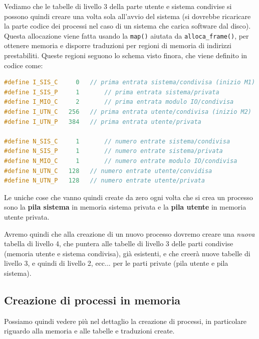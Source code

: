 \documentclass[a4paper,11pt]{article}
\begin{document}
Vediamo che le tabelle di livello 3 della parte utente e sistema condivise si possono quindi creare una volta sola all'avvio del sistema (si dovrebbe ricaricare la parte codice dei processi nel caso di un sistema che carica software dal disco).
Questa allocazione viene fatta usando la \lstinline|map()| aiutata da \lstinline|alloca_frame()|, per ottenere memoria e disporre traduzioni per regioni di memoria di indirizzi prestabiliti.
Queste regioni seguono lo schema visto finora, che viene definito in codice come:
\begin{lstlisting}[language=C++, style=codestyle]	
#define I_SIS_C		0 	// prima entrata sistema/condivisa (inizio M1)
#define I_SIS_P		1		// prima entrata sistema/privata
#define I_MIO_C		2		// prima entrata modulo IO/condivisa
#define I_UTN_C   256	// prima entrata utente/condivisa (inizio M2)
#define I_UTN_P	  384	// prima entrata utente/privata

#define N_SIS_C		1		// numero entrate sistema/condivisa
#define N_SIS_P		1		// numero entrate sistema/privata
#define N_MIO_C		1		// numero entrate modulo IO/condivisa
#define N_UTN_C	  128	// numero entrate utente/convidisa
#define N_UTN_P	  128	// numero entrate utente/privata
\end{lstlisting}

Le uniche cose che vanno quindi create da zero ogni volta che si crea un processo sono la \textbf{pila sistema} in memoria sistema privata e la \textbf{pila utente} in memoria utente privata.

Avremo quindi che alla creazione di un nuovo processo dovremo creare una \textit{nuova} tabella di livello 4, che puntera alle tabelle di livello 3 delle parti condivise (memoria utente e sistema condivisa), già esistenti, e che creerà nuove tabelle di livello 3, e quindi di livello 2, ecc... per le parti private (pila utente e pila sistema).

\subsection{Creazione di processi in memoria}
Possiamo quindi vedere più nel dettaglio la creazione di processi, in particolare riguardo alla memoria e alle tabelle e traduzioni create.
\end{document}
